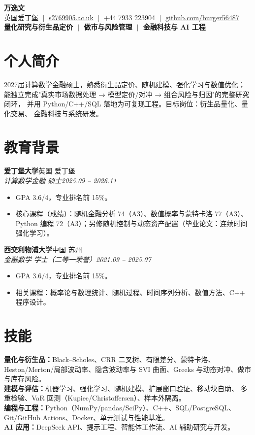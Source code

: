 \documentclass[a4paper,10pt]{ctexart}
\newcommand{\entry}[4]{\textbf{#1}\hfill #2\\ \textit{#3}\hfill \textit{#4}\\[-4pt]}
\begin{document}
\pagestyle{empty}
\begin{center}
{\LARGE\textbf{万逸文}}\\[1pt]
英国爱丁堡 $\;|\;$ \href{mailto:s2769905\@ed.ac.uk}{s2769905\@ed.ac.uk}
$\;|\;$ +44 7933 223904
$\;|\;$ \href{https://github.com/burger56487}{github.com/burger56487}\\[1pt]
\textbf{量化研究与衍生品定价 $\;|\;$ 做市与风险管理 $\;|\;$ 金融科技与 AI 工程}
\end{center}

\section{个人简介}
2027届计算数学金融硕士，熟悉衍生品定价、随机建模、强化学习与数值优化；
能独立完成"真实市场数据处理 → 模型定价/对冲 → 组合风险与归因"的完整研究闭环，
并用 Python/C++/SQL 落地为可复现工程。目标岗位：衍生品量化、量化交易、
金融科技与系统研发。

\section{教育背景}
\entry{爱丁堡大学}{英国 爱丁堡}{计算数学金融 硕士}{2025.09 -- 2026.11}
\begin{itemize}
\item GPA 3.6/4，专业排名前 15\%。
\item 核心课程（成绩）：随机金融分析 74（A3）、数值概率与蒙特卡洛 77（A3）、
Python 编程 72（A3）；另修随机控制与动态资产配置（毕业论文：连续时间强化学习）。
\end{itemize}
\entry{西交利物浦大学}{中国 苏州}{金融数学 学士（二等一荣誉）}{2021.09 -- 2025.07}
\begin{itemize}
\item GPA 3.6/4，专业排名前 15\%。
\item 相关课程：概率论与数理统计、随机过程、时间序列分析、数值方法、C++ 程序设计。
\end{itemize}

\section{技能}
\textbf{量化与衍生品：}Black--Scholes、CRR 二叉树、有限差分、蒙特卡洛、
Heston/Merton/局部波动率、隐含波动率与 SVI 曲面、Greeks 与动态对冲、做市与库存风险。\\
\textbf{建模与评估：}机器学习、强化学习、随机建模、扩展窗口验证、移动块自助、
多重检验、VaR 回测（Kupiec/Christoffersen）、样本外隔离。\\
\textbf{编程与工程：}Python（NumPy/pandas/SciPy）、C++、SQL/PostgreSQL、
Git/GitHub Actions、Docker、单元测试与性能基准。\\
\textbf{AI 应用：}DeepSeek API、提示工程、智能体工作流、AI 辅助研究与开发。
\end{document}
